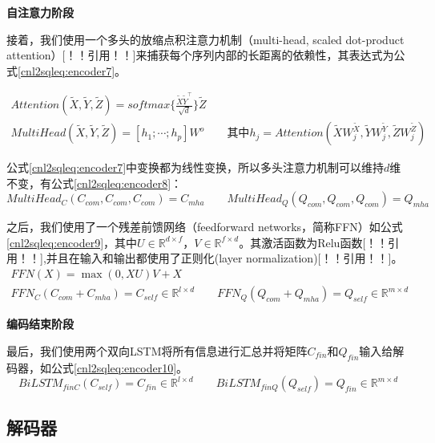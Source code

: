 \textbf{自注意力阶段}

接着，我们使用一个多头的放缩点积注意力机制（multi-head, scaled dot-product attention）[！！引用！！]来捕获每个序列内部的长距离的依赖性，其表达式为公式\ref{cnl2sqleq:encoder7}。

\begin{gather}
  \label{cnl2sqleq:encoder7}
  Attention(\widetilde{X},\widetilde{Y},\widetilde{Z}) = softmax\{\frac{\widetilde{X}\widetilde{Y}^{\top}}{\sqrt{d}}\} \widetilde{Z}\\
  MultiHead(\widetilde{X},\widetilde{Y},\widetilde{Z}) = [h_1;\cdots;h_p]W^o \qquad \mbox{其中}h_j= Attention(\widetilde{X}W^{\widetilde{X}}_j,\widetilde{Y}W^{\widetilde{Y}}_j,\widetilde{Z}W^{\widetilde{Z}}_j)
\end{gather}

公式\ref{cnl2sqleq:encoder7}中变换都为线性变换，所以多头注意力机制可以维持$d$维不变，有公式\ref{cnl2sqleq:encoder8}：
\begin{equation}
  \label{cnl2sqleq:encoder8}
  MultiHead_C(C_{com},C_{com},C_{com}) = C_{mha} \qquad MultiHead_Q(Q_{com},Q_{com},Q_{com}) = Q_{mha}
 \end{equation}

之后，我们使用了一个残差前馈网络（feedforward networks，简称FFN）如公式\ref{cnl2sqleq:encoder9}，其中$U \in \mathbb{R}^{d \times f}$，$V \in \mathbb{R}^{f \times d}$。其激活函数为Relu函数[！！引用！！],并且在输入和输出都使用了正则化(layer normalization)[！！引用！！]。
\begin{gather}
  \label{cnl2sqleq:encoder9}
  FFN(X) = \max(0,XU)V + X\\
  FFN_C(C_{com} + C_{mha}) = C_{self} \in \mathbb{R}^{l \times d} \qquad FFN_Q(Q_{com} + Q_{mha}) = Q_{self} \in \mathbb{R}^{m \times d}
\end{gather}

\textbf{编码结束阶段}

最后，我们使用两个双向LSTM将所有信息进行汇总并将矩阵$C_{fin}$和$Q_{fin}$输入给解码器，如公式\ref{cnl2sqleq:encoder10}。
\begin{equation}
  \label{cnl2sqleq:encoder10}
  BiLSTM_{finC}(C_{self}) = C_{fin} \in \mathbb{R}^{l \times d} \qquad BiLSTM_{finQ}(Q_{self}) = Q_{fin} \in \mathbb{R}^{m \times d} 
\end{equation}


\subsection{解码器}
\label{cnl2sql:decoder}

